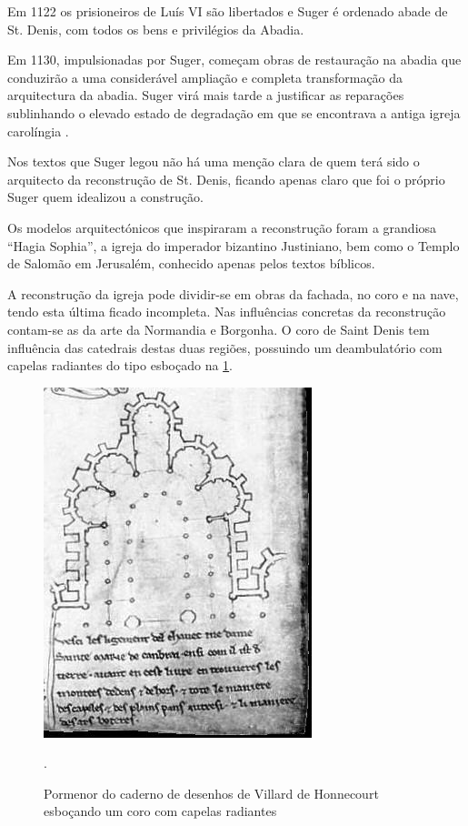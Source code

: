 \documentclass{article}
\begin{document}
Em 1122 os prisioneiros de Luís VI são libertados e Suger é ordenado
abade de St. Denis, com todos os bens e privilégios da Abadia.

Em 1130, impulsionadas por Suger, começam obras de restauração na
abadia que conduzirão a uma considerável ampliação e completa
transformação da arquitectura da abadia. Suger virá mais tarde a
justificar as reparações sublinhando o elevado estado de degradação em
que se encontrava a antiga igreja carolíngia \cite{calado}.

Nos textos que Suger legou não há uma menção clara de quem terá sido o
arquitecto da reconstrução de St. Denis, ficando apenas claro que foi
o próprio Suger quem idealizou a construção.

Os modelos arquitectónicos que inspiraram a reconstrução foram a
grandiosa ``Hagia Sophia'', a igreja do imperador bizantino
Justiniano, bem como o Templo de Salomão em Jerusalém, conhecido
apenas pelos textos bíblicos.

A reconstrução da igreja pode dividir-se em obras da fachada, no coro
e na nave, tendo esta última ficado incompleta. Nas influências
concretas da reconstrução contam-se as da arte da Normandia e
Borgonha. O coro de Saint Denis tem influência das catedrais destas
duas regiões, possuindo um deambulatório com capelas radiantes do tipo
esboçado na \ref{fig:1}.

\begin{figure}
\centering\includegraphics[height=0.6\textheight,keepaspectratio]
                          {images/villard-coro.jpg}
  \caption{Pormenor do caderno de desenhos de Villard de Honnecourt
    esboçando um coro com capelas radiantes}.
  \label{fig:1}
\end{figure}
\end{document}
